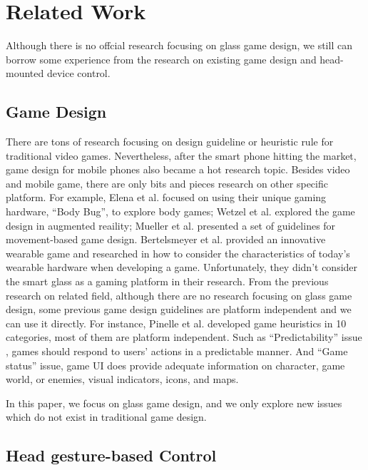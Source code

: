\section{Related Work}

Although there is no offcial research focusing on glass game design, we still can borrow some experience from the research on existing game design and head-mounted device control.


\subsection{Game Design}

There are tons of research focusing on design guideline or heuristic rule for traditional video games\cite{gameflow,criticalreview,chi04game,09game,02game,08game,07game}. Nevertheless, after the smart phone hitting the market, game design for mobile phones also became a hot research topic\cite{mobilegame,mobile06,mobile08,icec06}. Besides video and mobile game, there are only bits and pieces research on other specific platform. For example, Elena et al. focused on using their unique gaming hardware, ``Body Bug'', to explore body games\cite{bodygame}; Wetzel et al. explored the game design in augmented reaility\cite{argame}; Mueller et al. presented a set of guidelines for movement-based game design\cite{movegame}. Bertelsmeyer et al. provided an innovative wearable game and researched in how to consider the characteristics of today's wearable hardware when developing a game\cite{wearable}. Unfortunately, they didn't consider the smart glass as a gaming platform in their research. 
From the previous research on related field, although there are no research focusing on glass game design, some previous game design guidelines are platform independent and we can use it directly. For instance, Pinelle et al.\cite{videogame} developed game heuristics in 10 categories, most of them are platform independent. 
Such as ``Predictability'' issue , games should respond to users' actions in a predictable manner. And ``Game status'' issue, game UI does provide adequate information on character, game world, or enemies, visual indicators, icons, and maps. 

In this paper, we focus on glass game design, and we only explore new issues which do not exist in traditional game design.


\subsection{Head gesture-based Control}


